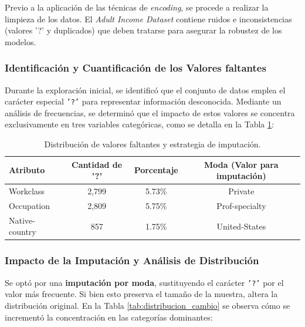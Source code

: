 \documentclass[a4paper,10pt]{book}
\begin{document}
		Previo a la aplicación de las técnicas de \textit{encoding}, se procede a realizar la limpieza de los datos. El \textit{Adult Income Dataset} contiene ruidos e inconsistencias (valores '?' y duplicados) que deben tratarse para asegurar la robustez de los modelos.
	
	\subsubsection{Identificación y Cuantificación de los Valores faltantes}
	
		Durante la exploración inicial, se identificó que el conjunto de datos emplea el carácter especial \texttt{'?'} para representar información desconocida. Mediante un análisis de frecuencias, se determinó que el impacto de estos valores se concentra exclusivamente en tres variables categóricas, como se detalla en la Tabla \ref{tab:nulos}:
		
		\begin{table}[H]
			\centering
			\begin{tabular}{|l|c|c|c|}
				\hline
				\rowcolor{FPcolor} 
				\textbf{Atributo} & \textbf{Cantidad de '?'} & \textbf{Porcentaje} & \textbf{Moda (Valor para imputación)} \\ \hline
				Workclass & 2,799 & 5.73\% & Private \\ \hline
				Occupation & 2,809 & 5.75\% & Prof-specialty \\ \hline
				Native-country & 857 & 1.75\% & United-States \\ \hline
			\end{tabular}
			\caption{Distribución de valores faltantes y estrategia de imputación.}
			\label{tab:nulos}
		\end{table}
	
	\subsubsection{Impacto de la Imputación y Análisis de Distribución}
	
		Se optó por una \textbf{imputación por moda}, sustituyendo el carácter \texttt{'?'} por el valor más frecuente. Si bien esto preserva el tamaño de la muestra, altera la distribución original. En la Tabla \ref{tab:distribucion_cambio} se observa cómo se incrementó la concentración en las categorías dominantes:
		
\end{document}
